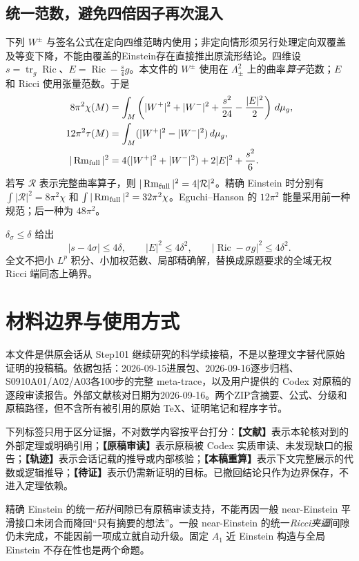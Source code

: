 \documentclass[UTF8,a4paper,11pt,fontset=fandol]{ctexart}
\numberwithin{equation}{section}
\theoremstyle{definition}
\newcommand{\Ric}{\operatorname{Ric}}
\newcommand{\Rm}{\operatorname{Rm}}
\newcommand{\tr}{\operatorname{tr}}
\newcommand{\dd}{\,d\mu_g}
\newcommand{\status}[1]{\textbf{【#1】}}
\begin{document}
\subsection{统一范数，避免四倍因子再次混入}
下列 $W^\pm$ 与签名公式在定向四维范畴内使用；非定向情形须另行处理定向双覆盖及等变下降，不能由覆盖的Einstein存在直接推出原流形结论。四维设 $s=\tr_g\Ric$、$E=\Ric-\frac{s}{4}g$。本文件的 $W^\pm$ 使用在 $\Lambda^2_\pm$ 上的曲率\emph{算子}范数；$E$ 和 Ricci 使用张量范数。于是
\begin{align}
8\pi^2\chi(M)&=\int_M\left(|W^+|^2+|W^-|^2+\frac{s^2}{24}-\frac{|E|^2}{2}\right)\dd,\label{eq:CGB}\\
12\pi^2\tau(M)&=\int_M(|W^+|^2-|W^-|^2)\dd,\label{eq:signature}\\
|\Rm_{\rm full}|^2&=4(|W^+|^2+|W^-|^2)+2|E|^2+\frac{s^2}{6}.
\end{align}
若写 $\mathcal R$ 表示完整曲率算子，则 $|\Rm_{\rm full}|^2=4|\mathcal R|^2$。精确 Einstein 时分别有 $\int|\mathcal R|^2=8\pi^2\chi$ 和 $\int|\Rm_{\rm full}|^2=32\pi^2\chi$。Eguchi--Hanson 的 $12\pi^2$ 能量采用前一种规范；后一种为 $48\pi^2$。

$\delta_\sigma\le\delta$ 给出
\begin{equation}
 |s-4\sigma|\le4\delta,\qquad |E|^2\le4\delta^2,\qquad
 |\Ric-\sigma g|^2\le4\delta^2.
\end{equation}
全文不把小 $L^p$ 积分、小加权范数、局部精确解，替换成原题要求的全域无权 Ricci 端同态上确界。

\section{材料边界与使用方式}
本文件是供原会话从 Step101 继续研究的科学续接稿，不是以整理文字替代原始证明的投稿稿。依据包括：2026-09-15进展包、2026-09-16逐步归档、S0910A01/A02/A03各100步的完整 meta-trace，以及用户提供的 Codex 对原稿的逐段审读报告。外部文献核对日期为2026-09-16。两个ZIP含摘要、公式、分级和原稿路径，但不含所有被引用的原始 TeX、证明笔记和程序字节。

下列标签只用于区分证据，不对数学内容按平台打分：\status{文献}表示本轮核对到的外部定理或明确引用；\status{原稿审读}表示原稿被 Codex 实质审读、未发现缺口的报告；\status{轨迹}表示会话记载的推导或内部核验；\status{本稿重算}表示下文完整展示的代数或逻辑推导；\status{待证}表示仍需新证明的目标。已撤回结论只作为边界保存，不进入定理依赖。

精确 Einstein 的统一\emph{拓扑}间隙已有原稿审读支持，不能再因一般 near-Einstein 平滑接口未闭合而降回“只有摘要的想法”。一般 near-Einstein 的统一\emph{Ricci夹逼}间隙仍未完成，不能因前一项成立就自动升级。固定 $A_1$ 近 Einstein 构造与全局 Einstein 不存在性也是两个命题。
\end{document}
